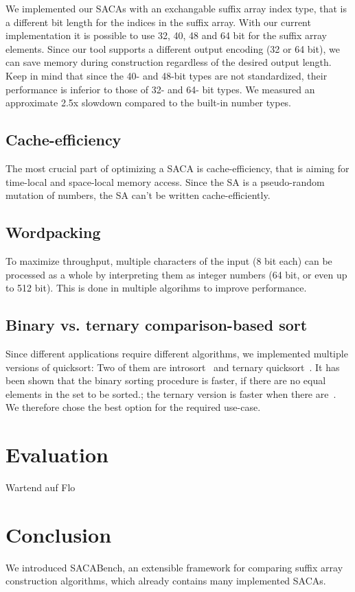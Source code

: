 We implemented our SACAs with an exchangable suffix array index type, that is a different bit length for the indices in the suffix array.
With our current implementation it is possible to use 32, 40, 48 and 64 bit for the suffix array elements.
Since our tool supports a different output encoding (32 or 64 bit), we can save memory during construction regardless of the desired output length.
Keep in mind that since the 40- and 48-bit types are not standardized, their performance is inferior to those of 32- and 64- bit types.
We measured an approximate 2.5x slowdown compared to the built-in number types.

\subsection{Cache-efficiency}

The most crucial part of optimizing a SACA is cache-efficiency, that is aiming for time-local and space-local memory access.
Since the SA is a pseudo-random mutation of numbers, the SA can't be written cache-efficiently.

\subsection{Wordpacking}

To maximize throughput, multiple characters of the input (8 bit each) can be processed as a whole by interpreting them as integer numbers (64 bit, or even up to 512 bit).
This is done in multiple algorihms to improve performance.

\subsection{Binary vs. ternary comparison-based sort}

Since different applications require different algorithms, we implemented multiple versions of quicksort:
Two of them are introsort~\cite{Musser97} and ternary quicksort~\cite{ternary_quicksort}.
It has been shown that the binary sorting procedure is faster,
if there are no equal elements in the set to be sorted.;
the ternary version is faster when there are~\cite{ternary_quicksort}.
We therefore chose the best option for the required use-case.

\section{Evaluation}

Wartend auf Flo

\section{Conclusion}

We introduced SACABench, an extensible framework for comparing suffix array construction algorithms,
which already contains many implemented SACAs.

